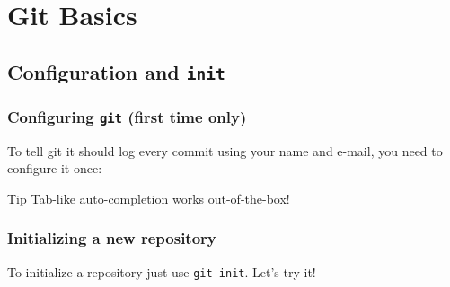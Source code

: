 \section{Git Basics}





\subsection{Configuration and \texttt{init}}

\begin{frame}
  \frametitle{Configuring \texttt{git} (first time only)}

  To tell git it should log every commit using your name and e-mail, you need
  to configure it once:

  \vspace{2em}

  \gitonetwo

  \begin{exampleblock}{Tip}
    Tab-like auto-completion works out-of-the-box!
  \end{exampleblock}

\end{frame}


\begin{frame}
  \frametitle{Initializing a new repository}

  To initialize a repository just use \texttt{git init}. Let's try it!

  \vspace{2em}

  \gitone

\end{frame}


